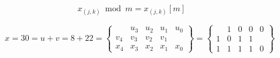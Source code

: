 \documentclass[twoside]{article}
\begin{document}
\begin{equation}
x_{(j,k)} \bmod m = x_{(j,k)}[m]
\end{equation}

\begin{center}
\begin{figure}[tb!]
\begin{displaymath}
x = 30 = u+v = 8 + 22 = \left\{
\begin{array}{ccccc}
    & u_3 & u_2 & u_1 & u_0 \\
v_4 & v_3 & v_2 & v_1 &    \\
\hline
x_4 & x_3 & x_2 & x_1 & x_0
\end{array}
\right\}
=
\left\{
\begin{array}{ccccc}
    & 1 & 0 & 0 & 0 \\
  1 & 0 & 1 & 1 &   \\
\hline
1 & 1 & 1 & 1 & 0
\end{array}
\right\}
\end{displaymath}
\label{fig:csa-encoding}
\end{figure}
\end{center}
%
\end{document}
